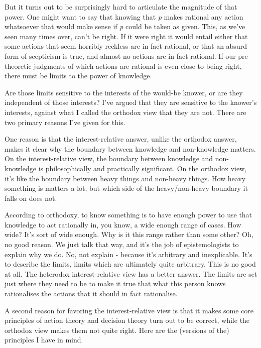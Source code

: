 \documentclass[
  12pt,
  letterpaper,
]{scrbook}
\begin{document}
But it turns out to be surprisingly hard to articulate the magnitude of
that power. One might want to say that knowing that \emph{p} makes
rational any action whatsoever that would make sense if \emph{p} could
be taken as given. This, as we've seen many times over, can't be right.
If it were right it would entail either that some actions that seem
horribly reckless are in fact rational, or that an absurd form of
scepticism is true, and almost no actions are in fact rational. If our
pre-theoretic judgments of which actions are rational is even close to
being right, there must be limits to the power of knowledge.

Are those limits sensitive to the interests of the would-be knower, or
are they independent of those interests? I've argued that they are
sensitive to the knower's interests, against what I called the orthodox
view that they are not. There are two primary reasons I've given for
this.

One reason is that the interest-relative answer, unlike the orthodox
answer, makes it clear why the boundary between knowledge and
non-knowledge matters. On the interest-relative view, the boundary
between knowledge and non-knowledge is philosophically and practically
significant. On the orthodox view, it's like the boundary between heavy
things and non-heavy things. How heavy something is matters a lot; but
which side of the heavy/non-heavy boundary it falls on does not.

According to orthodoxy, to know something is to have enough power to use
that knowledge to act rationally in, you know, a wide enough range of
cases. How wide? It's sort of wide enough. Why is it this range rather
than some other? Oh, no good reason. We just talk that way, and it's the
job of epistemologists to explain why we do. No, not explain - because
it's arbitrary and inexplicable. It's to describe the limits, limits
which are ultimately quite arbitrary. This is no good at all. The
heterodox interest-relative view has a better answer. The limits are set
just where they need to be to make it true that what this person knows
rationalises the actions that it should in fact rationalise.

A second reason for favoring the interest-relative view is that it makes
some core principles of action theory and decision theory turn out to be
correct, while the orthodox view makes them not quite right. Here are
the (versions of the) principles I have in mind.
\end{document}
